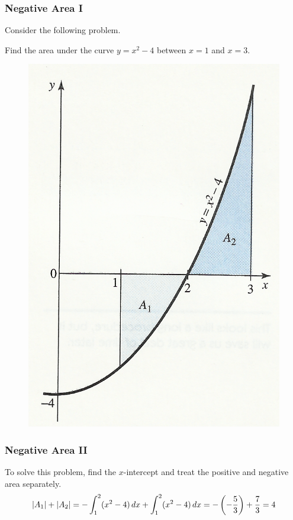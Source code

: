 \documentclass[xcolor=dvipsnames]{beamer}
\begin{document}
\begin{frame}
  \frametitle{Negative Area I}
Consider the following problem.
\begin{block}{}
Find the area under the curve $y=x^{2}-4$ between $x=1$ and $x=3$.
\end{block}
\begin{figure}[h]
\includegraphics[scale=.6]{./negarea.png}
\end{figure}
\end{frame}

\begin{frame}
  \frametitle{Negative Area II}
To solve this problem, find the $x$-intercept and treat the positive
and negative area separately. 
\begin{equation}
  \label{eq:aisohphu}
  \vert{}A_{1}\vert{}+\vert{}A_{2}\vert{}=-\int_{1}^{2}(x^{2}-4)\,dx+\int_{1}^{2}(x^{2}-4)\,dx=-\left(-\frac{5}{3}\right)+\frac{7}{3}=4\notag
\end{equation}
\end{frame}
\end{document}
